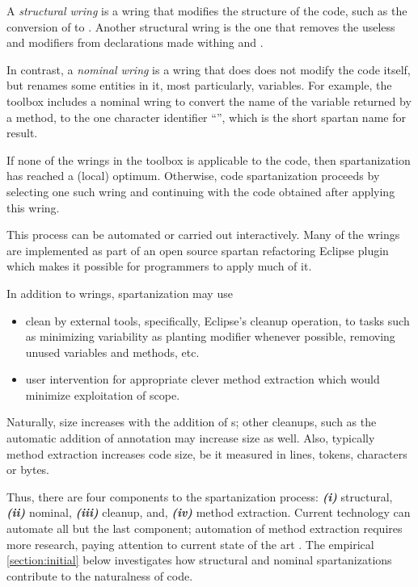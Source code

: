 A \emph{structural wring} is a wring that modifies the structure of the code,
such as the conversion of  to . Another structural wring is
the one that removes the useless  and  modifiers from
declarations made withing and . 

In contrast, a \emph{nominal wring} is a wring that does does not modify the
code itself, but renames some entities in it, most particularly, variables.
For example, the toolbox includes a nominal wring to convert the name of the
variable returned by a method, to the one character identifier ``\cc{\$}'',
which is the short spartan name for result.

If none of the wrings in the toolbox is applicable to the code, then
spartanization has reached a (local) optimum. Otherwise, code spartanization
proceeds by selecting one such wring and continuing with the code obtained
after applying this wring.

This process can be automated or carried out interactively. Many of the wrings
are implemented as part of an open source spartan refactoring Eclipse
plugin which
makes it possible for programmers to apply much of it.

In addition to wrings, spartanization may use 
\begin{itemize}
    \item  clean by external tools, specifically, Eclipse's cleanup operation, 
      to tasks such as minimizing variability as planting  modifier
      whenever possible, removing unused variables and methods, etc.  
    \item user intervention for appropriate 
        clever method extraction which would minimize exploitation of scope.
\end{itemize}
Naturally, size increases with the addition of s; other cleanups, such
as the automatic addition of  annotation may increase size as well.
Also, typically method extraction increases code size, be it measured in lines,
  tokens, characters or bytes. 

Thus, there are four components to the spartanization process:
\emph{\textbf{(i)}} structural, 
\emph{\textbf{(ii)}} nominal, 
\emph{\textbf{(iii)}} cleanup, and,  
\emph{\textbf{(iv)}} method extraction. 
Current technology can automate all but the last component; 
automation of method extraction requires more research,
paying attention to current state of the art \matteo\cite{ 
    we should have many citations
    somewhere can you please add some citations
}.
The empirical \cref{section:initial} below investigates how structural and
nominal spartanizations contribute to the naturalness of code.

